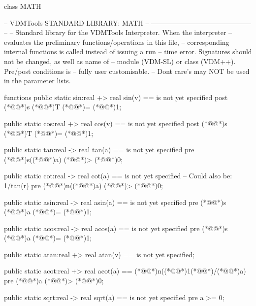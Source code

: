 \documentclass[a4paper]{article}
\begin{document}
\title{}
\author{}
\begin{vdm_al}
class MATH

--  VDMTools STANDARD LIBRARY: MATH
--      --------------------------------------------
-- 
-- Standard library for the VDMTools Interpreter. When the interpreter
-- evaluates the preliminary functions/operations in this file,
-- corresponding internal functions is called instead of issuing a run
-- time error. Signatures should not be changed, as well as name of
-- module (VDM-SL) or class (VDM++). Pre/post conditions is 
-- fully user customisable. 
-- Dont care's may NOT be used in the parameter lists.

  functions
public static
    sin:real +> real
    sin(v) ==
    is not yet specified    
    post (*@@*)s (*@@*)T (*@\vdmnotcovered{<}@*)= (*@\vdmnotcovered{}@*)1;

public static
    cos:real +> real
    cos(v) ==
    is not yet specified
    post (*@@*)s (*@@*)T (*@\vdmnotcovered{<}@*)= (*@\vdmnotcovered{}@*)1;

public static
    tan:real -> real
    tan(a) ==
    is not yet specified
    pre (*@@*)s((*@\vdmnotcovered{}@*)a) (*@\vdmnotcovered{<}@*)> (*@\vdmnotcovered{}@*)0;

public static
    cot:real -> real 
    cot(a) ==
    is not yet specified -- Could also be: 1/tan(r)
    pre (*@@*)n((*@\vdmnotcovered{}@*)a) (*@\vdmnotcovered{<}@*)> (*@\vdmnotcovered{}@*)0;

public static
    asin:real -> real
    asin(a) ==
    is not yet specified
    pre (*@@*)s (*@\vdmnotcovered{}@*)a (*@\vdmnotcovered{<}@*)= (*@\vdmnotcovered{}@*)1;

public static
    acos:real -> real
    acos(a) ==
    is not yet specified
    pre (*@@*)s (*@\vdmnotcovered{}@*)a (*@\vdmnotcovered{<}@*)= (*@\vdmnotcovered{}@*)1;

public static
    atan:real +> real
    atan(v) ==
    is not yet specified;

public static
    acot:real +> real
    acot(a) ==
    (*@@*)n((*@\vdmnotcovered{}@*)1(*@\vdmnotcovered{}@*)/(*@\vdmnotcovered{}@*)a)
    pre (*@\vdmnotcovered{}@*)a (*@\vdmnotcovered{<}@*)> (*@\vdmnotcovered{}@*)0;

public static
    sqrt:real -> real
    sqrt(a) ==
    is not yet specified
    pre a >= 0;


\end{vdm_al}
\end{document}
